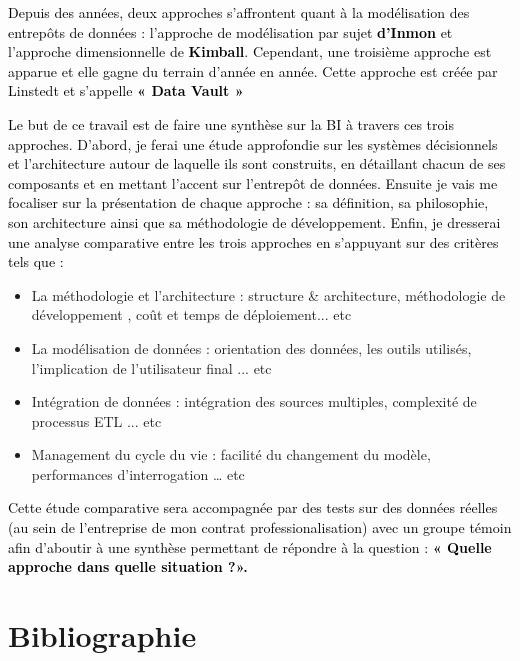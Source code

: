 \documentclass[a4paper,12pt]{report}
\begin{document}
\textcolor{black}{ Depuis des années, deux approches s’affrontent quant à la modélisation des entrepôts de
données : l’approche de modélisation par sujet  \textbf{d’Inmon }et l’approche dimensionnelle de  \textbf{ Kimball}.
Cependant, une troisième approche est apparue et elle gagne du terrain d’année en année. Cette
approche est créée par Linstedt et s’appelle \textbf{ « Data Vault »}}

\textcolor{black}{Le but de ce travail est de faire une synthèse sur la BI à travers ces trois approches. D’abord, je ferai une étude approfondie sur les systèmes décisionnels et l’architecture autour de laquelle ils sont construits, en détaillant chacun de ses composants et en mettant l’accent sur l’entrepôt de données. Ensuite je vais me focaliser sur la présentation de chaque approche : sa définition, sa philosophie, son architecture ainsi que sa méthodologie de développement. Enfin, je dresserai une analyse comparative entre les trois approches en s’appuyant sur des critères tels que :}

\begin{itemize}
	\item La méthodologie et l'architecture : structure \& architecture, méthodologie de développement , coût et temps de déploiement... etc
	\item La modélisation de données : orientation des données, les outils utilisés, l'implication de l'utilisateur final ... etc 
	\item Intégration de données : intégration des sources multiples, complexité de processus ETL ... etc
	\item Management du cycle du vie : facilité du changement du modèle, performances d'interrogation … etc
	
	
\end{itemize}



\textcolor{black}{ Cette étude comparative sera accompagnée par des tests sur des données réelles (au sein de l'entreprise de mon contrat professionalisation) avec un groupe témoin afin d’aboutir à une synthèse permettant de répondre à la question :  \textbf{ « Quelle approche dans quelle situation ?».}}
\\
	
\vspace{1cm}
\section*{Bibliographie}
\vspace{1cm}
\end{document}
